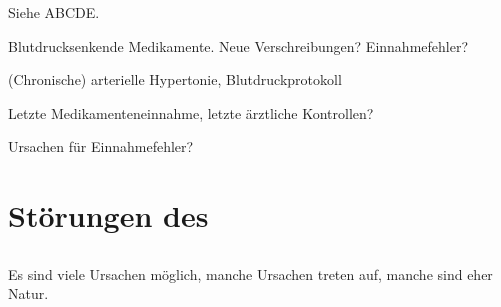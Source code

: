 {
\begin{SAMPLERSlide}
  \item[\SAMPLER{S}] Siehe ABCDE.
  \item[\SAMPLER{M}] Blutdrucksenkende Medikamente. 
  Neue Verschreibungen? Einnahmefehler? 
  \item[\SAMPLER{P}] (Chronische) arterielle Hypertonie, Blutdruckprotokoll
  \item[\SAMPLER{L}] Letzte
  Medikamenteneinnahme, letzte ärztliche
  Kontrollen? 
  \item[\SAMPLER{E}] Ursachen für Einnahmefehler?
\end{SAMPLERSlide}
}
{}
{}
{}










\clearpage
\section{Störungen des }
\subsection{}
\label{topic:herzinsuffizienz}


Es sind viele Ursachen
möglich, manche Ursachen treten  auf, manche sind
eher  Natur.



